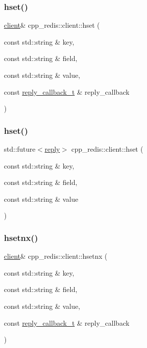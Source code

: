 \subsubsection{\texorpdfstring{hset()}{hset()}\hspace{0.1cm}{\footnotesize\ttfamily [1/2]}}
{\footnotesize\ttfamily \hyperlink{classcpp__redis_1_1client}{client}\& cpp\+\_\+redis\+::client\+::hset (\begin{DoxyParamCaption}\item[{const std\+::string \&}]{key,  }\item[{const std\+::string \&}]{field,  }\item[{const std\+::string \&}]{value,  }\item[{const \hyperlink{classcpp__redis_1_1client_a061a1140d36d2eaeda82b09a0bb3f9f2}{reply\+\_\+callback\+\_\+t} \&}]{reply\+\_\+callback }\end{DoxyParamCaption})}

\mbox{\label{classcpp__redis_1_1client_ae212c8371dbd9ceff386f789226eb173}} 
\subsubsection{\texorpdfstring{hset()}{hset()}\hspace{0.1cm}{\footnotesize\ttfamily [2/2]}}
{\footnotesize\ttfamily std\+::future$<$\hyperlink{classcpp__redis_1_1reply}{reply}$>$ cpp\+\_\+redis\+::client\+::hset (\begin{DoxyParamCaption}\item[{const std\+::string \&}]{key,  }\item[{const std\+::string \&}]{field,  }\item[{const std\+::string \&}]{value }\end{DoxyParamCaption})}

\mbox{\label{classcpp__redis_1_1client_a6cf21d60012fc82075deb801a32e8d60}} 
\subsubsection{\texorpdfstring{hsetnx()}{hsetnx()}\hspace{0.1cm}{\footnotesize\ttfamily [1/2]}}
{\footnotesize\ttfamily \hyperlink{classcpp__redis_1_1client}{client}\& cpp\+\_\+redis\+::client\+::hsetnx (\begin{DoxyParamCaption}\item[{const std\+::string \&}]{key,  }\item[{const std\+::string \&}]{field,  }\item[{const std\+::string \&}]{value,  }\item[{const \hyperlink{classcpp__redis_1_1client_a061a1140d36d2eaeda82b09a0bb3f9f2}{reply\+\_\+callback\+\_\+t} \&}]{reply\+\_\+callback }\end{DoxyParamCaption})}

